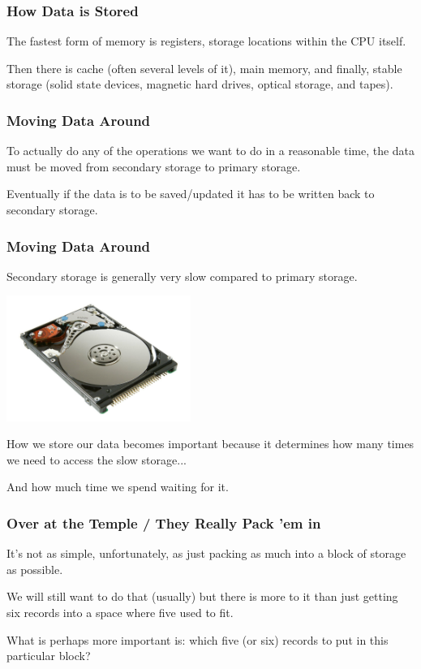 \begin{frame}
\frametitle{How Data is Stored}

The fastest form of memory is registers, storage locations within the CPU itself. 

Then there is cache (often several levels of it), main memory, and finally, stable storage (solid state devices, magnetic hard drives, optical storage, and tapes). 

\end{frame}



\begin{frame}
\frametitle{Moving Data Around}

To actually do any of the operations we want to do in a reasonable time, the data must be moved from secondary storage to primary storage. 

Eventually if the data is to be saved/updated it has to be written back to secondary storage.

\end{frame}



\begin{frame}
\frametitle{Moving Data Around}

Secondary storage is generally very slow compared to primary storage. 

\begin{center}
	\includegraphics[width=0.45\textwidth]{images/hdd.jpg}
\end{center}

How we store our data becomes important because it determines how many times we need to access the slow storage...

And how much time we spend waiting for it.

\end{frame}



\begin{frame}
\frametitle{Over at the Temple / They Really Pack 'em in}

It's not as simple, unfortunately, as just packing as much into a block of storage as possible. 

We will still want to do that (usually) but there is more to it than just getting six records into a space where five used to fit. 

What is perhaps more important is: which five (or six) records to put in this particular block?


\end{frame}



